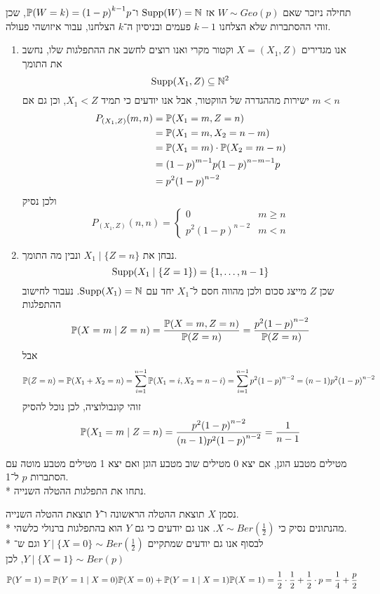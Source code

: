 \begin{solution}
	תחילה ניזכר שאם $W \sim Geo(p)$ אז $\operatorname{Supp}(W) = \mathbb{N}$ ו־$\mathbb{P}(W = k) = {(1 - p)}^{k - 1} p$, שכן זוהי ההסתברות שלא הצלחנו $k - 1$ פעמים ובניסיון ה־$k$ הצלחנו, עבור איזושהי פעולה.
	\begin{enumerate}
		\item אנו מגדירים $X = (X_1, Z)$ וקטור מקרי ואנו רוצים לחשב את ההתפלגות שלו, נחשב את התומך
			\[
				\operatorname{Supp}(X_1, Z) \subseteq \mathbb{N}^2
			\]
			ישירות מההגדרה של הווקטור, אבל אנו יודעים כי תמיד $X_1 < Z$, וכן גם אם $m < n$
			\begin{align*}
				P_{(X_1, Z)}(m, n)
				& = \mathbb{P}(X_1 = m, Z = n) \\
				& = \mathbb{P}(X_1 = m, X_2 = n - m) \\
				& = \mathbb{P}(X_1 = m) \cdot \mathbb{P}(X_2 = m - n) \\
				& = {(1 - p)}^{m - 1} p {(1 - p)}^{n - m - 1} p \\
				& = p^2 {(1 - p)}^{n - 2}
			\end{align*}
			ולכן נסיק
			\[
				P_{(X_1, Z)}(n, n) = \begin{cases}
					0 & m \ge n \\
					p^2 {(1 - p)}^{n - 2} & m < n
				\end{cases}
			\]
		\item נבחן את $X_1 \mid \{ Z = n\}$ ונבין מה התומך.
			\[
				\operatorname{Supp}(X_1 \mid \{Z = 1\})
				= \{1, \dots, n - 1\}
			\]
			שכן $Z$ מייצג סכום ולכן מהווה חסם ל־$X_1$ יחד עם $\operatorname{Supp}(X_1) = \mathbb{N}$. נעבור לחישוב ההתפלגות
			\[
				\mathbb{P}(X = m \mid Z = n)
				= \frac{\mathbb{P}(X = m, Z = n)}{\mathbb{P}(Z = n)}
				= \frac{p^2 {(1 - p)}^{n - 2}}{\mathbb{P}(Z = n)}
			\]
			אבל
			\[
				\mathbb{P}(Z = n)
				= \mathbb{P}(X_1 + X_2 = n)
				= \sum_{i = 1}^{n - 1}  \mathbb{P}(X_1 = i, X_2 = n - i)
				= \sum_{i = 1}^{n - 1}  p^2 {(1 - p)}^{n - 2}
				= (n - 1) p^2 {(1 - p)}^{n - 2}
			\]
			זוהי קונבולוציה, לכן נוכל להסיק
			\[
				\mathbb{P}(X_1 = m \mid Z = n)
				= \frac{p^2 {(1 - p)}^{n - 2}}{(n - 1) p^2 {(1 - p)}^{n - 2}}
				= \frac{1}{n - 1}
			\]
	\end{enumerate}
\end{solution}
\begin{exercise}
	מטילים מטבע הוגן, אם יצא 0 מטילים שוב מטבע הוגן ואם יצא 1 מטילים מטבע מוטה עם הסתברות $p$ ל־1. \\*
	נתחו את התפלגות ההטלה השנייה.
\end{exercise}
\begin{solution}
	נסמן $X$ תוצאת ההטלה הראשונה ו־$Y$ תוצאת ההטלה השנייה. \\*
	מהנתונים נסיק כי $X \sim Ber(\frac{1}{2})$. אנו גם יודעים כי גם $Y$ הוא בהתפלגות ברנולי כלשהי. \\*
	לבסוף אנו גם יודעים שמתקיים $Y \mid \{X = 0\} \sim Ber(\frac{1}{2})$ וגם ש־$Y \mid \{X = 1\} \sim Ber(p)$, לכן
	\[
		\mathbb{P}(Y = 1)
		= \mathbb{P}(Y = 1 \mid X = 0) \mathbb{P}(X = 0) + \mathbb{P}(Y = 1 \mid X = 1) \mathbb{P}(X = 1)
		= \frac{1}{2} \cdot \frac{1}{2} + \frac{1}{2} \cdot p
		= \frac{1}{4} + \frac{p}{2}
	\]
\end{solution}
